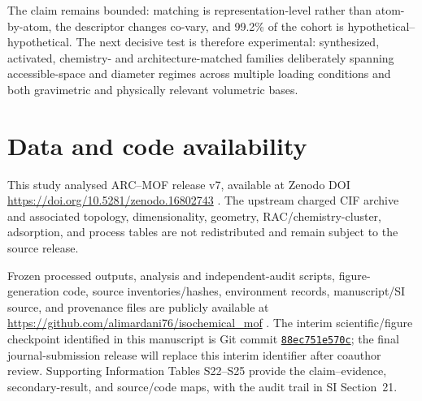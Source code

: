 \documentclass[11pt,a4paper]{article}
\newcommand{\SIsec}[1]{SI Section~#1}
\begin{document}
The claim remains bounded: matching is representation-level rather than
atom-by-atom, the descriptor changes co-vary, and 99.2\% of the cohort is
hypothetical--hypothetical. The next decisive test is therefore experimental:
synthesized, activated, chemistry- and architecture-matched families deliberately
spanning accessible-space and diameter regimes across multiple loading conditions
and both gravimetric and physically relevant volumetric bases.

\section*{Data and code availability}

This study analysed ARC--MOF release v7, available at Zenodo DOI
\url{https://doi.org/10.5281/zenodo.16802743}
\cite{burner2025arcmofdata}. The upstream charged CIF archive and associated
topology, dimensionality, geometry, RAC/chemistry-cluster, adsorption, and process
tables are not redistributed and remain subject to the source release.

Frozen processed outputs, analysis and independent-audit scripts, figure-generation
code, source inventories/hashes, environment records, manuscript/SI source, and
provenance files are publicly available at
\url{https://github.com/alimardani76/isochemical_mof}
\cite{alimardaniabaei2026repository}. The interim scientific/figure checkpoint
identified in this manuscript is Git commit
\href{https://github.com/alimardani76/isochemical_mof/commit/88ec751e570c0519bc8f503732ccd74fc02f5f73}{\texttt{88ec751e570c}}; the final journal-submission
release will replace this interim identifier after coauthor review. Supporting
Information Tables S22--S25 provide the claim--evidence, secondary-result, and
source/code maps, with the audit trail in \SIsec{21}.



\end{document}
